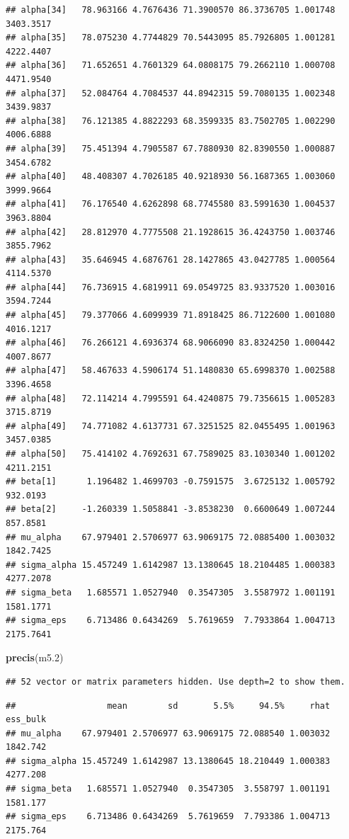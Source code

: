 \documentclass[
]{book}
\newenvironment{Shaded}{\begin{snugshade}}{\end{snugshade}}
\newcommand{\FloatTok}[1]{\textcolor[rgb]{0.00,0.00,0.81}{#1}}
\newcommand{\FunctionTok}[1]{\textcolor[rgb]{0.13,0.29,0.53}{\textbf{#1}}}
\newcommand{\NormalTok}[1]{#1}
\begin{document}
\begin{verbatim}
## alpha[34]   78.963166 4.7676436 71.3900570 86.3736705 1.001748 3403.3517
## alpha[35]   78.075230 4.7744829 70.5443095 85.7926805 1.001281 4222.4407
## alpha[36]   71.652651 4.7601329 64.0808175 79.2662110 1.000708 4471.9540
## alpha[37]   52.084764 4.7084537 44.8942315 59.7080135 1.002348 3439.9837
## alpha[38]   76.121385 4.8822293 68.3599335 83.7502705 1.002290 4006.6888
## alpha[39]   75.451394 4.7905587 67.7880930 82.8390550 1.000887 3454.6782
## alpha[40]   48.408307 4.7026185 40.9218930 56.1687365 1.003060 3999.9664
## alpha[41]   76.176540 4.6262898 68.7745580 83.5991630 1.004537 3963.8804
## alpha[42]   28.812970 4.7775508 21.1928615 36.4243750 1.003746 3855.7962
## alpha[43]   35.646945 4.6876761 28.1427865 43.0427785 1.000564 4114.5370
## alpha[44]   76.736915 4.6819911 69.0549725 83.9337520 1.003016 3594.7244
## alpha[45]   79.377066 4.6099939 71.8918425 86.7122600 1.001080 4016.1217
## alpha[46]   76.266121 4.6936374 68.9066090 83.8324250 1.000442 4007.8677
## alpha[47]   58.467633 4.5906174 51.1480830 65.6998370 1.002588 3396.4658
## alpha[48]   72.114214 4.7995591 64.4240875 79.7356615 1.005283 3715.8719
## alpha[49]   74.771082 4.6137731 67.3251525 82.0455495 1.001963 3457.0385
## alpha[50]   75.414102 4.7692631 67.7589025 83.1030340 1.001202 4211.2151
## beta[1]      1.196482 1.4699703 -0.7591575  3.6725132 1.005792  932.0193
## beta[2]     -1.260339 1.5058841 -3.8538230  0.6600649 1.007244  857.8581
## mu_alpha    67.979401 2.5706977 63.9069175 72.0885400 1.003032 1842.7425
## sigma_alpha 15.457249 1.6142987 13.1380645 18.2104485 1.000383 4277.2078
## sigma_beta   1.685571 1.0527940  0.3547305  3.5587972 1.001191 1581.1771
## sigma_eps    6.713486 0.6434269  5.7619659  7.7933864 1.004713 2175.7641
\end{verbatim}

\begin{Shaded}
\begin{Highlighting}[]
\FunctionTok{precis}\NormalTok{(m5}\FloatTok{.2}\NormalTok{)}
\end{Highlighting}
\end{Shaded}

\begin{verbatim}
## 52 vector or matrix parameters hidden. Use depth=2 to show them.
\end{verbatim}

\begin{verbatim}
##                  mean        sd       5.5%     94.5%     rhat ess_bulk
## mu_alpha    67.979401 2.5706977 63.9069175 72.088540 1.003032 1842.742
## sigma_alpha 15.457249 1.6142987 13.1380645 18.210449 1.000383 4277.208
## sigma_beta   1.685571 1.0527940  0.3547305  3.558797 1.001191 1581.177
## sigma_eps    6.713486 0.6434269  5.7619659  7.793386 1.004713 2175.764
\end{verbatim}
\end{document}
